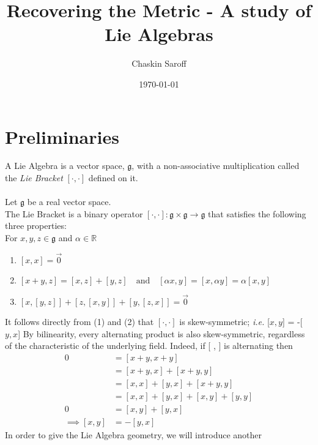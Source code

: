 \documentclass[11 pt]{article}
\title{Recovering the Metric - A study of Lie Algebras}
\author{Chaskin Saroff}
\date{\today} \draft
\renewcommand{\a}{\alpha}
\newcommand{\fg}{\mathfrak{g}}
\newcommand{\RR}{\mathbb{R}}
\begin{document}
\maketitle


\section{Preliminaries}

\begin{definition}

A Lie Algebra is a vector space, $\fg$, with a non-associative multiplication
called the \emph{Lie Bracket} $[\cdot,\cdot]$ defined on it.
\\
\\Let $\fg$ be a real vector space.
\\The Lie Bracket is a binary operator $ [\cdot,\cdot]: \fg \times \fg \to \fg$
that satisfies the following three properties:
\\For $x,y,z \in \fg$ and $\a \in \RR$
\begin{enumerate}
    \item  $[x,x]=\Vec{0}$ 

    \item  $[x+y,z] = [x,z]+[y,z]\quad \text{and} \quad [\a x,y]=[x, \a y]=\a[x, y]$ 

    \item  $[x,[y,z]] + [z,[x,y]] + [y,[z,x]] = \Vec{0}$ 
\end{enumerate}
\end{definition}
It follows directly from (1) and (2) that $[\cdot,\cdot]$ is skew-symmetric; \emph{i.e.} [$x,y$] = -[$y,x$]
By bilinearity, every alternating product is also skew-symmetric, regardless of the characteristic of the underlying field. Indeed, if [ , ] is alternating then
    \begin{align}
        0 &= [x + y, x + y] 
        \\&= [x + y, x] + [x + y, y]
        \\&= [x,x] + [y, x] + [x + y, y]
        \\&= [x,x] + [y, x] + [x, y] + [y, y]
        \\0&=         [x, y] + [y, x]
        \\\implies [x,y] &= -[y,x]
    \end{align}
    In order to give the Lie Algebra geometry, we will introduce another
\end{document}

